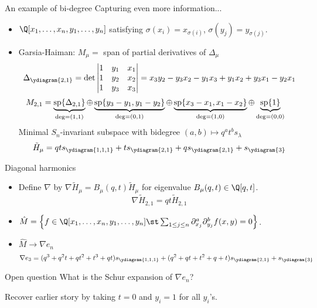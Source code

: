 \documentclass{beamer}
\renewcommand{\Span}{\operatorname{sp}}
\begin{document}
\begin{frame}{An example of bi-degree}
  Capturing even more information...\pause
  \begin{itemize}
  \item \(\Q[x_1,\ldots,x_n,y_1,\ldots,y_n]\) satisfying
    \(\sigma(x_i) = x_{\sigma(i)}\), \(\sigma(y_j) = y_{\sigma(j)}\).\pause
  \item Garsia-Haiman: \(M_\mu = \) span of partial derivatives of
    \(\Delta_\mu\) \pause \[
      \Delta_{\ydiagram{2,1}} = \det \left|
        \begin{matrix}
          1 & y_1 & x_1 \\
          1 & y_2 & x_2 \\
          1 & y_3 & x_3
        \end{matrix}
      \right| = x_3 y_2 - y_3 x_2 - y_1 x_3 + y_1 x_2 + y_3 x_1 - y_2 x_1
    \]
    \pause
  \[
    \hspace{-1em}
      M_{2,1} = \underbrace{\Span\{\Delta_{2,1}\}}_{\deg = (1,1)}
      \oplus \underbrace{\Span\{y_3-y_1, y_1 - y_2\}}_{\deg = (0,1)}
      \oplus \underbrace{\Span\{x_3-x_1, x_1 - x_2\}}_{\deg = (1,0)}
      \oplus \underbrace{\Span \{1\}}_{\deg = (0,0)}
    \]
    \pause
    Minimal \(S_n\)-invariant subspace with bidegree \((a,b) \mapsto
    q^at^b s_\lambda\) \pause \[
      \tilde{H}_\mu = qt s_{\ydiagram{1,1,1}} + t
      s_{\ydiagram{2,1}} + q s_{\ydiagram{2,1}} + s_{\ydiagram{3}}
    \]
  \end{itemize}
\end{frame}
\begin{frame}{Diagonal harmonics}
  \begin{itemize}
  \item Define \(\nabla\) by \(\nabla \tilde{H}_\mu = B_\mu(q,t) \tilde{H}_\mu\) for
    eigenvalue \(B_\mu(q,t) \in \Q[q,t]\). \[
      \nabla \tilde{H}_{2,1} = qt \tilde{H}_{2,1}
    \]\pause
  \item \(\hat{M} = \left\{ f \in \Q[x_1,\ldots,x_n,y_1,\ldots,y_n] \st
    \sum_{1 \leq j \leq n} \partial_{x_j}^a \partial_{y_j}^b f(x,y) =
    0 \right\}\).\pause
\item \(\hat{M} \to  \nabla e_n\)
  \[
    \nabla e_3 = (q^3+q^2t+qt^2+t^3+qt)s_{\ydiagram{1, 1, 1}} + (q^2+qt+t^2+q+t)s_{\ydiagram{2, 1}} + s_{\ydiagram{3}}
  \]\pause
    \end{itemize}
    \begin{block}{Open question}
      \pause
      What is the Schur expansion of \(\nabla e_n\)?
      \pause
    \end{block}
    Recover earlier story by taking \(t=0\) and \(y_i = 1\) for all \(y_i\)'s.
\end{frame}
\end{document}
